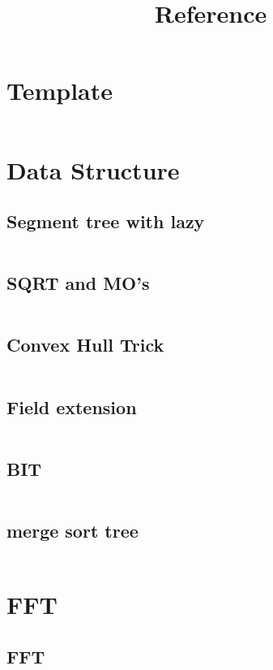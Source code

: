 \documentclass[11pt]{article}
\title{Reference}
\begin{document}
		

			\section{Template}
			\inputminted[tabsize=2,breaklines,fontsize=\small]{c++}{template.cpp}
			\section{Data Structure}
				\subsection{Segment tree with lazy}
					\inputminted[tabsize=2,breaklines,fontsize=\small]{c++}{DataStructures/SegmentTree.cpp}
				\subsection{SQRT and MO's}
					\inputminted[tabsize=2,breaklines,fontsize=\small]{c++}{DataStructures/sqrtDecom.cpp}
				\subsection{Convex Hull Trick}
					\inputminted[tabsize=2,breaklines,fontsize=\small]{c++}{DataStructures/ConvexHullTrick.cpp}
				\subsection{Field extension}
					\inputminted[tabsize=2,breaklines,fontsize=\small]{c++}{DataStructures/EX.cpp}
				\subsection{BIT}
					\inputminted[tabsize=2,breaklines,fontsize=\small]{c++}{DataStructures/BIT.cpp}
				\subsection{merge sort tree}
					\inputminted[tabsize=2,breaklines,fontsize=\small]{c++}{DataStructures/mergeSortTree.cpp}
			\section{FFT}
				\subsection{FFT}
					\inputminted[tabsize=2,breaklines,fontsize=\small]{c++}{FFT/FFT.cpp}
\end{document}
